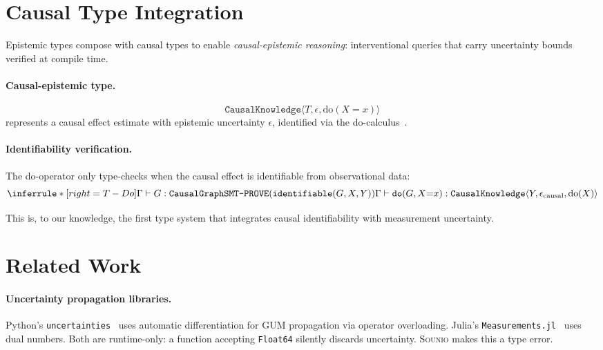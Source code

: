 \documentclass[acmsmall,screen,review,anonymous]{acmart}
\newcommand{\sounio}{\textsc{Sounio}\xspace}
\newcommand{\cknow}[3]{\texttt{CausalKnowledge}\langle #1, #2, #3 \rangle}
\newcommand{\eps}{\epsilon}
\begin{document}
\section{Causal Type Integration}
\label{sec:causal}

Epistemic types compose with causal types to enable
\emph{causal-epistemic reasoning}: interventional queries that
carry uncertainty bounds verified at compile time.

\paragraph{Causal-epistemic type.}
\[
\cknow{T}{\eps}{\text{do}(X{=}x)}
\]
represents a causal effect estimate with epistemic uncertainty $\eps$,
identified via the do-calculus~\cite{pearl2009causality}.

\paragraph{Identifiability verification.}
The do-operator only type-checks when the causal effect is
identifiable from observational data:
\[
\inferrule*[right=T-Do]
  {\Gamma \vdash G : \texttt{CausalGraph} \\
   \texttt{SMT-PROVE}(\texttt{identifiable}(G, X, Y))}
  {\Gamma \vdash \texttt{do}(G, X{=}x) : \cknow{Y}{\eps_{\text{causal}}}{\text{do}(X)}}
\]

This is, to our knowledge, the first type system that integrates
causal identifiability with measurement uncertainty.

\section{Related Work}
\label{sec:related}

\paragraph{Uncertainty propagation libraries.}
Python's \texttt{uncertainties}~\cite{lebigot2024uncertainties} uses
automatic differentiation for GUM propagation via operator overloading.
Julia's \texttt{Measurements.jl}~\cite{giordano2016measurements} uses
dual numbers.
Both are runtime-only: a function accepting \texttt{Float64} silently
discards uncertainty.
\sounio makes this a type error.
\end{document}

